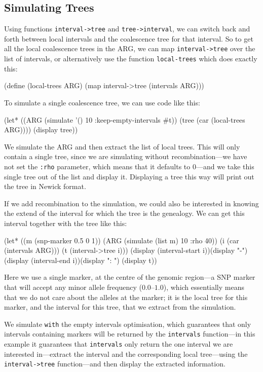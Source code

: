 \documentclass{manual}
\begin{document}
\subsection{Simulating Trees}
\label{sec:simulating-trees}

Using functions \texttt{interval->tree} and \texttt{tree->interval},
we can switch back and forth between local intervals and the
coalescence tree for that interval.  So to get all the local
coalescence trees in the ARG, we can map \texttt{interval->tree} over
the list of intervals, or alternatively use the function
\texttt{local-trees} which does exactly this:
\begin{code}
(define (local-trees ARG) (map interval->tree (intervals ARG)))
\end{code}

To simulate a single coalescence tree, we can use code like this:
\begin{code}
(let* ((ARG (simulate '() 10 :keep-empty-intervals #t))
       (tree (car (local-trees ARG))))
  (display tree))
\end{code}
We simulate the ARG and then extract the list of local trees.  This
will only contain a single tree, since we are simulating without
recombination---we have not set the \texttt{:rho} parameter, which
means that it defaults to $0$---and we take this single tree out of
the list and display it.  Displaying a tree this way will print out
the tree in Newick format.

If we add recombination to the simulation, we could also be interested
in knowing the extend of the interval for which the tree is the
genealogy.  We can get this interval together with the tree like this:
\begin{code}
(let* ((m (snp-marker 0.5 0 1))
       (ARG (simulate (list m) 10 :rho 40))
       (i (car (intervals ARG)))
       (t (interval->tree i)))
  (display (interval-start i))(display "-")
  (display (interval-end i))(display ": ")
  (display t))
\end{code}
Here we use a single marker, at the centre of the genomic region---a
SNP marker that will accept any minor allele frequency ($0.0$--$1.0$), which
essentially means that we do not care about the alleles at the marker;
it is the local tree for this marker, and the interval for this tree,
that we extract from the simulation.

We simulate \texttt{with} the empty intervals optimisation, which
guarantees that only intervals containing markers will be returned by
the \texttt{intervals} function---in this example it guarantees that
\texttt{intervals} only return the one interval we are interested
in---extract the interval and the corresponding local tree---using the
\texttt{interval->tree} function---and then display the extracted
information.
\end{document}
